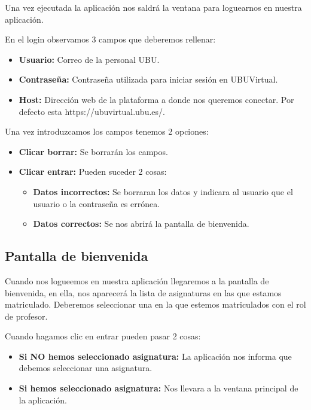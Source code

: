 Una vez ejecutada la aplicación nos saldrá la ventana para loguearnos en nuestra aplicación.


En el login observamos 3 campos que deberemos rellenar:

\begin{itemize}
	\tightlist
	\item
	\textbf{Usuario:} Correo de la personal UBU.
	\item
	\textbf{Contraseña:} Contraseña utilizada para iniciar sesión en UBUVirtual.
	\item
	\textbf{Host:} Dirección web de la plataforma a donde nos queremos conectar. Por defecto esta https://ubuvirtual.ubu.es/.
\end{itemize}

Una vez introduzcamos los campos tenemos 2 opciones:

\begin{itemize}
	\tightlist
	\item
	\textbf{Clicar borrar:} Se borrarán los campos.
	\item
	\textbf{Clicar entrar:} Pueden suceder 2 cosas:
	\begin{itemize}
		\tightlist
		\item
		\textbf{Datos incorrectos:} Se borraran los datos y indicara al usuario que el usuario o la contraseña es errónea.
		\item
		\textbf{Datos correctos:} Se nos abrirá la pantalla de bienvenida.
	\end{itemize}
\end{itemize}

\subsection{Pantalla de bienvenida}


Cuando nos logueemos en nuestra aplicación llegaremos a la pantalla de bienvenida, en ella, nos aparecerá la lista de asignaturas en las que estamos matriculado. Deberemos seleccionar una en la que estemos matriculados con el rol de profesor.


Cuando hagamos clic en entrar pueden pasar 2 cosas:

\begin{itemize}
	\tightlist
	\item
	\textbf{Si NO hemos seleccionado asignatura:} La aplicación nos informa que debemos seleccionar una asignatura.
	\item
	\textbf{Si hemos seleccionado asignatura:} Nos llevara a la ventana principal de la aplicación.
	
\end{itemize}

